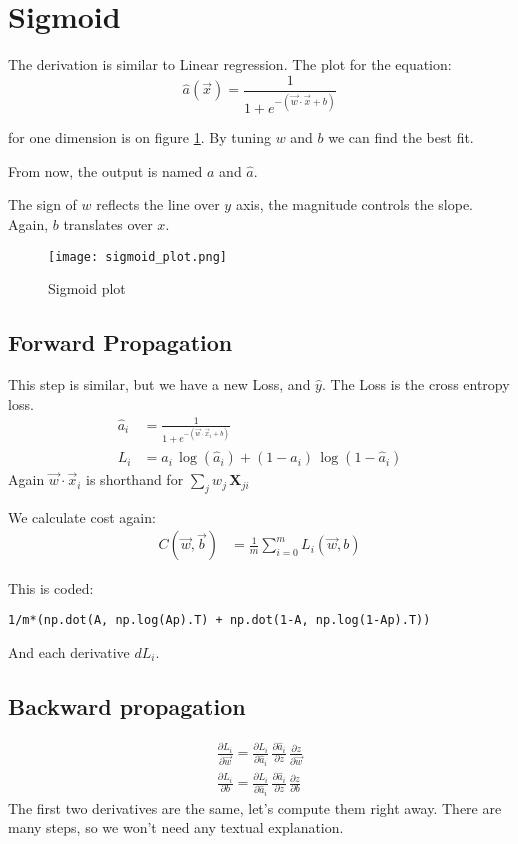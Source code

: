 \section{Sigmoid}
The derivation is similar to Linear regression. The plot for the equation:
\[
  \hat{a}(\vec{x})= \frac{1}{1+e^{-(\vec{w}\cdot{}\vec{x}+b)}}
\]

for one dimension is on figure \ref{fig:sigmoid}. By tuning $w$ and $b$  we can find the best fit. 

From now, the output is named $a$ and $\hat{a}$.

The sign of $w$ reflects the line over $y$ axis, the magnitude controls the slope. Again, $b$ translates over $x$.

\begin{figure}[h]
 \centering
 \texttt{[image: sigmoid\_plot.png]}
  \caption{Sigmoid plot} \label{fig:sigmoid}
\end{figure}

\subsection{Forward Propagation}
This step is similar, but we have a new Loss, and $\hat{y}$. 
The Loss is the cross entropy loss.
\begin{align}
  \hat{a}_i &= \frac{1}{1+e^{-(\vec{w}\cdot \vec{x}_i + b)}}\\
  L_i &= a_i\,\log(\hat{a}_i) + (1-a_i)\,\log(1-\hat{a}_i)
\end{align}
Again $\vec{w}\cdot{}\vec{x}_i$ is shorthand for $\sum_{j} w_j\,\mathbf{X}_{ji}$

We calculate cost again:
\begin{align*}
  C(\vec{w}, \vec{b}) &= \frac{1}{m}\sum_{i=0}^m L_i(\vec{w}, b)
\end{align*}

This is coded:
\begin{verbatim}
1/m*(np.dot(A, np.log(Ap).T) + np.dot(1-A, np.log(1-Ap).T))
\end{verbatim}
And each derivative $dL_i$.

\subsection{Backward propagation}

\begin{align}
  \frac{\partial L_i}{\partial \vec{w}} = 
  \frac{\partial L_i}{\partial \hat{a}_i}\, \frac{\partial \hat{a}_i}{\partial z}\,\frac{\partial z}{\partial \vec{w}}\\
  \frac{\partial L_i}{\partial b} = 
  \frac{\partial L_i}{\partial \hat{a}_i}\,\frac{\partial \hat{a}_i}{\partial z}\,\frac{\partial z}{\partial b}
\end{align}
The first two derivatives are the same, let's compute them right away. There are many steps, so we won't need any textual explanation.

